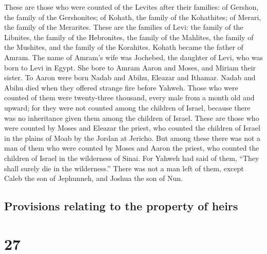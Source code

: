 These are those who were counted of the Levites after
their families: of Gershon, the family of the Gershonites; of Kohath,
the family of the Kohathites; of Merari, the family of the Merarites.
 These are the families of Levi: the family of the
Libnites, the family of the Hebronites, the family of the Mahlites, the
family of the Mushites, and the family of the Korahites. Kohath became
the father of Amram.  The name of Amram's wife was
Jochebed, the daughter of Levi, who was born to Levi in Egypt. She bore
to Amram Aaron and Moses, and Miriam their sister.  To
Aaron were born Nadab and Abihu, Eleazar and Ithamar. 
Nadab and Abihu died when they offered strange fire before Yahweh.
 Those who were counted of them were twenty-three
thousand, every male from a month old and upward; for they were not
counted among the children of Israel, because there was no inheritance
given them among the children of Israel.  These are those
who were counted by Moses and Eleazar the priest, who counted the
children of Israel in the plains of Moab by the Jordan at Jericho.
 But among these there was not a man of them who were
counted by Moses and Aaron the priest, who counted the children of
Israel in the wilderness of Sinai.  For Yahweh had said
of them, ``They shall surely die in the wilderness.'' There was not a
man left of them, except Caleb the son of Jephunneh, and Joshua the son
of Nun.

\hypertarget{provisions-relating-to-the-property-of-heirs}{%
\subsection{Provisions relating to the property of
heirs}\label{provisions-relating-to-the-property-of-heirs}}

\hypertarget{section-26}{%
\section{27}\label{section-26}}

